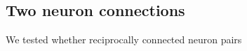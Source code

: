 \clearpage
\pagebreak
\newpage

\subsection*{Two neuron connections}

We tested whether reciprocally connected neuron pairs 



